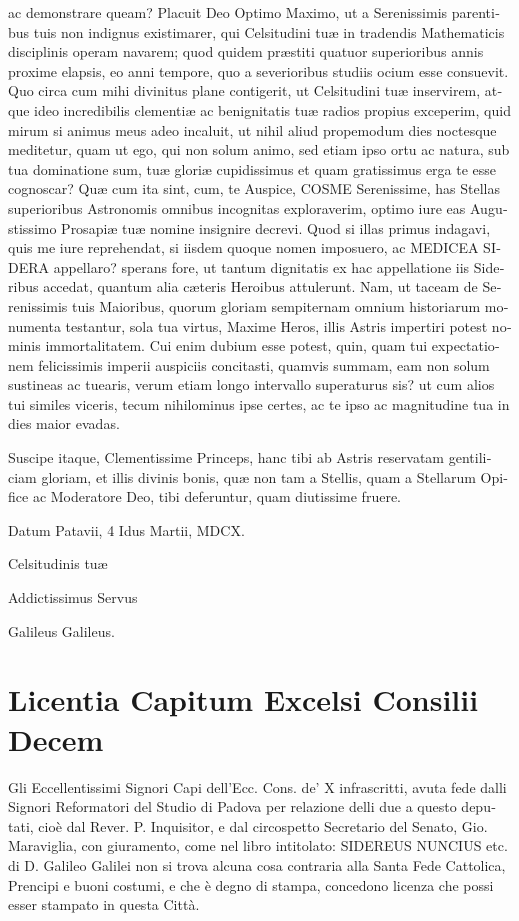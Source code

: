 \documentclass[11pt,twoside,openany]{book}
\begin{document}
\begin{otherlanguage}{latin}
ac demonstrare queam? Placuit Deo Optimo Maximo, ut a Serenissimis parentibus tuis non indignus existimarer, qui Celsitudini tuæ in tradendis Mathematicis disciplinis operam navarem; quod quidem præstiti quatuor superioribus annis proxime elapsis, eo anni tempore, quo a severioribus studiis ocium esse consuevit. Quo circa cum mihi divinitus plane contigerit, ut Celsitudini tuæ inservirem, atque ideo incredibilis clementiæ ac benignitatis tuæ radios propius exceperim, quid mirum si animus meus adeo incaluit, ut nihil aliud propemodum dies noctesque meditetur, quam ut ego, qui non solum animo, sed etiam ipso ortu ac natura, sub tua dominatione sum, tuæ gloriæ cupidissimus et quam gratissimus erga te esse cognoscar? Quæ cum ita sint, cum, te Auspice, COSME Serenissime, has Stellas superioribus Astronomis omnibus incognitas exploraverim, optimo iure eas Augustissimo Prosapiæ tuæ nomine insignire decrevi. Quod si illas primus indagavi, quis me iure reprehendat, si iisdem quoque nomen imposuero, ac MEDICEA SIDERA appellaro? sperans fore, ut tantum dignitatis ex hac appellatione iis Sideribus accedat, quantum alia cæteris Heroibus attulerunt. Nam, ut taceam de Serenissimis tuis Maioribus, quorum gloriam sempiternam omnium historiarum monumenta testantur, sola tua virtus, Maxime Heros, illis Astris impertiri potest nominis immortalitatem. Cui enim dubium esse potest, quin, quam tui expectationem felicissimis imperii auspiciis concitasti, quamvis summam, eam non solum sustineas ac tuearis, verum etiam longo intervallo superaturus sis? ut cum alios tui similes viceris, tecum nihilominus ipse certes, ac te ipso ac magnitudine tua in dies maior evadas.

Suscipe itaque, Clementissime Princeps, hanc tibi ab Astris reservatam gentiliciam gloriam, et illis divinis bonis, quæ non tam a Stellis, quam a Stellarum Opifice ac Moderatore Deo, tibi deferuntur, quam diutissime fruere.

Datum Patavii, 4 Idus Martii, MDCX.

Celsitudinis tuæ

Addictissimus Servus

Galileus Galileus.

\chapter*{Licentia Capitum Excelsi Consilii Decem}

Gli Eccellentissimi Signori Capi dell'Ecc. Cons. de' X infrascritti, avuta fede dalli Signori Reformatori del Studio di Padova per relazione delli due a questo deputati, cioè dal Rever. P. Inquisitor, e dal circospetto Secretario del Senato, Gio. Maraviglia, con giuramento, come nel libro intitolato: SIDEREUS NUNCIUS etc. di D. Galileo Galilei non si trova alcuna cosa contraria alla Santa Fede Cattolica, Prencipi e buoni costumi, e che è degno di stampa, concedono licenza che possi esser stampato in questa Città.


\end{otherlanguage}
\end{document}
